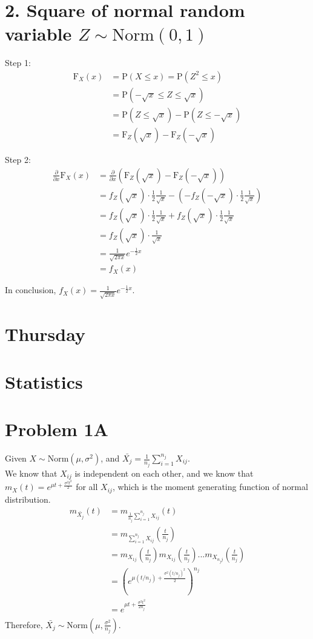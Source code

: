 \documentclass{article}
\begin{document}
\section*{2. Square of normal random variable $Z\sim \text{Norm}(0,1)$}
Step 1:
\begin{align*}
\text{F}_X(x) &= \text{P}(X \leq x) = \text{P}(Z^2 \leq x)\\
&=   \text{P}(-\sqrt{x} \leq Z \leq \sqrt{x})\\
&=  \text{P}(Z \leq \sqrt{x}) - \text{P}(Z \leq -\sqrt{x}) \\
&= \text{F}_Z(\sqrt{x}) - \text{F}_Z(-\sqrt{x})
\end{align*}

Step 2:
\begin{align*}
\frac{\partial}{\partial x}\text{F}_X(x) &= \frac{\partial}{\partial x}\left(\text{F}_Z(\sqrt{x}) - \text{F}_Z(-\sqrt{x})\right)\\
&=f_Z(\sqrt{x}) \cdot \frac{1}{2} \frac{1}{\sqrt{x}} - (- f_Z(-\sqrt{x}) \cdot \frac{1}{2} \frac{1}{\sqrt{x}})\\
&=f_Z(\sqrt{x}) \cdot \frac{1}{2} \frac{1}{\sqrt{x}} + f_Z(\sqrt{x}) \cdot \frac{1}{2} \frac{1}{\sqrt{x}}\\
&= f_Z(\sqrt{x}) \cdot \frac{1}{\sqrt{x}}\\ 
&= \frac{1}{\sqrt{2 \pi x}}e^{-\frac{1}{2}x}\\
&=f_X(x)
\end{align*}

In conclusion, $f_X(x) = \frac{1}{\sqrt{2 \pi x}}e^{-\frac{1}{2}x}$.


\section*{{\textcolor{Boogie}{Thursday}}}
\section*{Statistics}
\section*{Problem 1A}
Given $X \sim \text{Norm}(\mu,\sigma^2)$, and $\bar{X_j} = \frac{1}{n_j} \sum_{i=1}^{n_j} X_{ij}$.\\
We know that $X_{ij}$ is independent on each other, and we know that $m_X(t) = e^{\mu t+ \frac{\sigma^2 t^2}{2}}$ for all $X_{ij}$, which is the moment generating function of normal distribution. \\
\begin{align*}
m_{\bar{X_j}}(t) &= m_{\frac{1}{n_j} \sum_{i=1}^{n_j} X_{ij}}(t)\\
&= m_{\sum_{i=1}^{n_j} X_{ij}}(\frac{t}{n_j})\\
&= m_{X_{1j}}(\frac{t}{n_j})m_{X_{1j}}(\frac{t}{n_j})... m_{X_{n_jj}}(\frac{t}{n_j})\\
&= (e^{\mu (t/n_j)+ \frac{\sigma^2  (t/n_j)^2}{2}})^{n_j}\\
&= e^{\mu t+ \frac{\sigma^2  t^2}{2n_j}}\\
\end{align*}
Therefore, $\bar{X_j} \sim \text{Norm}(\mu, \frac{\sigma^2}{n_j})$.
\end{document}
